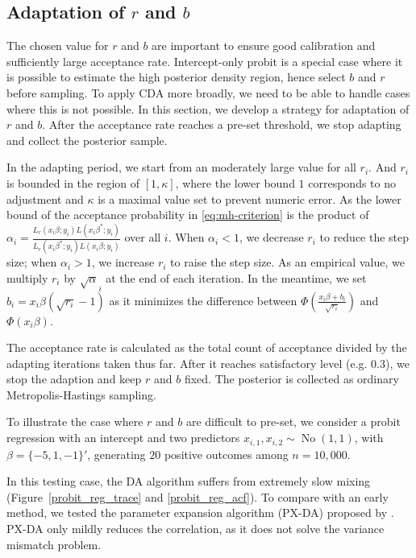 \documentclass[10pt]{article}
\newcommand{\xbeta}{ x_i \beta}
\DeclareMathOperator{\No}{No}
\begin{document}
\subsection{Adaptation of $r$ and $b$}
The chosen value for $r$ and $b$ are important to ensure good calibration and sufficiently large acceptance rate. Intercept-only probit is a special case where it is possible to estimate the high posterior density region, hence select $b$ and $r$ before sampling. To apply CDA more broadly, we need to be able to handle cases where this is not possible. In this section, we develop a strategy for adaptation of $r$ and $b$. After the acceptance rate reaches a pre-set threshold, we stop adapting and collect the posterior sample.

In the adapting period, we start from an moderately large value for all $r_i$. And  $r_i$ is bounded in the region of $[1, \kappa]$, where the lower bound $1$ corresponds to no adjustment and $\kappa$ is a maximal value set to prevent numeric error. As the lower bound of the acceptance probability in \eqref{eq:mh-criterion} is the product of  $\alpha_i= \frac{   L_r(\xbeta;y_i) L(\xbeta^*;y_i)}{ L_r(\xbeta^*;y_i)L(\xbeta;y_i) }$ over all $i$. When $\alpha_i<1$, we decrease $r_i$ to reduce the step size; when $\alpha_i>1$, we increase $r_i$ to raise the step size.  As an empirical value, we multiply $r_i$ by $\sqrt \alpha_i$ at the end of each iteration. In the meantime, we set $b_i= \xbeta (\sqrt{r_i}-1)$ as it minimizes the difference between $\Phi( \frac{\xbeta+b_i}{\sqrt{r_i}})$ and $\Phi(\xbeta)$.

The acceptance rate is calculated as the total count of acceptance divided by the adapting iterations taken thus far. After it reaches satisfactory level (e.g. $0.3$), we stop the adaption and keep $r$ and $b$ fixed. The posterior is collected as ordinary Metropolis-Hastings sampling.

To illustrate the case where $r$ and $b$ are difficult to pre-set, we consider a probit regression with an intercept and two predictors $x_{i,1},x_{i,2}\sim \No(1,1)$, with $\beta=\{-5,1,-1\}'$, generating $20$ positive outcomes among $n=10,000$. 

In this testing case, the \cite{albert1993bayesian} DA algorithm suffers from extremely slow mixing (Figure~\ref{probit_reg_trace} and \ref{probit_reg_acf}). To compare with an early method, we tested the parameter expansion algorithm (PX-DA) proposed by \cite{liu1999parameter}. PX-DA only mildly reduces the correlation, as it does not solve the variance mismatch problem.
\end{document}
